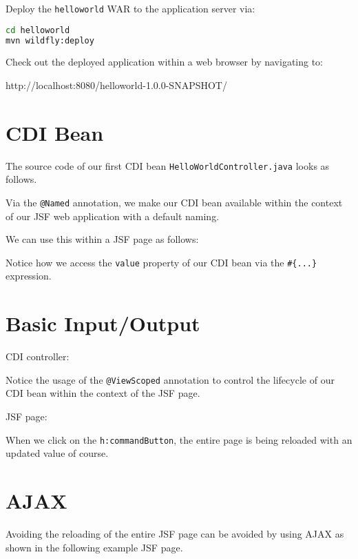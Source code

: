 Deploy the \texttt{helloworld} WAR to the application server via:
\begin{lstlisting}[language=bash]
cd helloworld
mvn wildfly:deploy
\end{lstlisting}

Check out the deployed application within a web browser by navigating to:

http://localhost:8080/helloworld-1.0.0-SNAPSHOT/

\section{CDI Bean}

The source code of our first CDI bean \texttt{HelloWorldController.java} looks as follows.

Via the \texttt{@Named} annotation, we make our CDI bean available within the context of our JSF web application with a default naming.

We can use this within a JSF page as follows:


Notice how we access the \texttt{value} property of our CDI bean via the \texttt{\#\{...\}} expression.

\section{Basic Input/Output}

CDI controller:


Notice the usage of the \texttt{@ViewScoped} annotation to control the lifecycle of our CDI bean within the context of the JSF page.

JSF page:


When we click on the \texttt{h:commandButton}, the entire page is being reloaded with an updated value of course.


\section{AJAX}

Avoiding the reloading of the entire JSF page can be avoided by using AJAX as shown in the following example JSF page.

